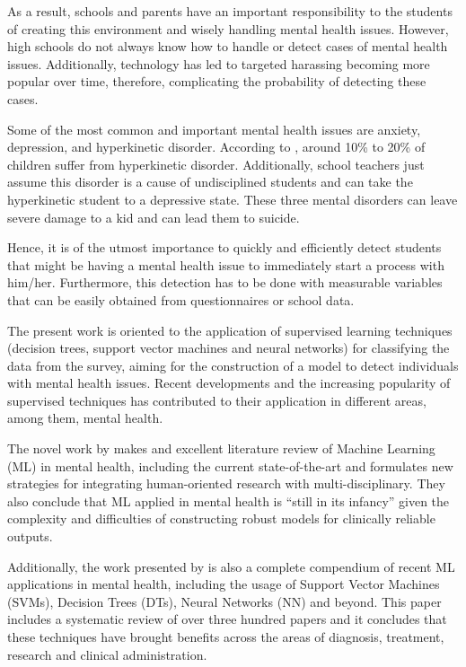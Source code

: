 \documentclass[conference]{IEEEtran}
\theoremstyle{definition}
\theoremstyle{remark}
\theoremstyle{remark}
\begin{document}
As a result, schools and parents have an important responsibility to the
students of creating this environment and wisely handling mental health issues.
However, high schools do not always know how to handle or detect cases of mental
health issues. Additionally, technology has led to targeted harassing becoming
more popular over time, therefore, complicating the probability of detecting
these cases.

Some of the most common and important mental health issues are anxiety,
depression, and hyperkinetic disorder. According to \textcite{schulte2016},
around 10\% to 20\% of children suffer from hyperkinetic disorder. Additionally,
school teachers just assume this disorder is a cause of undisciplined students
and can take the hyperkinetic student to a depressive state. These three mental
disorders can leave severe damage to a kid and can lead them to suicide.

Hence, it is of the utmost importance to quickly and efficiently detect students
that might be having a mental health issue to immediately start a process with
him/her. Furthermore, this detection has to be done with measurable variables
that can be easily obtained from questionnaires or school data.

The present work is oriented to the application of supervised learning
techniques (decision trees, support vector machines and neural networks) for
classifying the data from the survey, aiming for the construction of a model to
detect individuals with mental health issues. Recent developments and the
increasing popularity of supervised techniques has contributed to their
application in different areas, among them, mental health.

The novel work by \textcite{thieme2020} makes and excellent literature review of
Machine Learning (ML) in mental health, including the current state-of-the-art
and formulates new strategies for integrating human-oriented research with
multi-disciplinary. They also conclude that ML applied in mental health is
``still in its infancy'' given the complexity and difficulties of constructing
robust models for clinically reliable outputs.

Additionally, the work presented by \textcite{shatte2019} is also a complete
compendium of recent ML applications in mental health, including the usage of
Support Vector Machines (SVMs), Decision Trees (DTs), Neural Networks (NN) and
beyond. This paper includes a systematic review of over three hundred papers and
it concludes that these techniques have brought benefits across the areas of
diagnosis, treatment, research and clinical administration.
\end{document}
